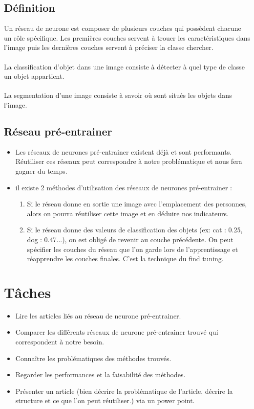 \documentclass[11pt]{report}
\begin{document}
	\subsection{Définition}
	Un réseau de neurone est composer de plusieurs couches qui possèdent chacune un rôle spécifique. Les premières couches servent à trouer les caractéristiques dans l'image puis les dernières couches servent à préciser la classe chercher.\\\\
	La classification d'objet dans une image consiste à détecter à quel type de classe un objet appartient.\\\\
	La segmentation d'une image consiste à savoir où sont situés les objets dans l'image.

	\subsection{Réseau pré-entrainer}
		\begin{itemize}
			\item Les réseaux de neurones pré-entrainer existent déjà et sont performants. Réutiliser ces réseaux peut correspondre à notre problématique et nous fera gagner du temps. \\
			\item il existe 2 méthodes d'utilisation des réseaux de neurones pré-entrainer :
			\begin{enumerate}
				\item Si le réseau donne en sortie une image avec l'emplacement des personnes, alors on pourra réutiliser cette image et en déduire nos indicateurs.
				\item Si le réseau donne des valeurs de classification des objets (ex: cat : 0.25, dog : 0.47...), on est obligé de revenir au couche précédente. On peut spécifier les couches du réseau que l'on garde lors de l'apprentissage et réapprendre les couches finales. C'est la technique du find tuning. \\
			\end{enumerate}
		\end{itemize}

\section{Tâches}
	\begin{itemize}
		\item Lire les articles liés au réseau de neurone pré-entrainer. \\
		\item Comparer les différents réseaux de neurone pré-entrainer trouvé qui correspondent à notre besoin. \\
		\item Connaître les problématiques des méthodes trouvés.\\
		\item Regarder les performances et la faisabilité des méthodes.\\
		\item Présenter un article (bien décrire la problématique de l'article, décrire la structure et ce que l'on peut réutiliser.) via un power point.
	\end{itemize}
\end{document}
